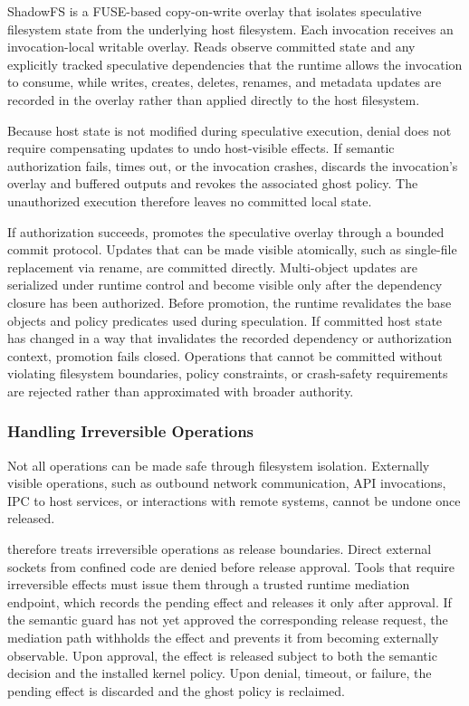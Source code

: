 ShadowFS is a FUSE-based copy-on-write overlay that isolates speculative
filesystem state from the underlying host filesystem. Each invocation receives
an invocation-local writable overlay. Reads observe committed state and any
explicitly tracked speculative dependencies that the runtime allows the
invocation to consume, while writes, creates, deletes, renames, and metadata
updates are recorded in the overlay rather than applied directly to the host
filesystem.

Because host state is not modified during speculative execution, denial does
not require compensating updates to undo host-visible effects. If semantic
authorization fails, times out, or the invocation crashes, \SystemName discards
the invocation's overlay and buffered outputs and revokes the associated ghost
policy. The unauthorized execution therefore leaves no committed local state.

If authorization succeeds, \SystemName promotes the speculative overlay through
a bounded commit protocol. Updates that can be made visible atomically, such as
single-file replacement via rename, are committed directly. Multi-object
updates are serialized under runtime control and become visible only after the
dependency closure has been authorized. Before promotion, the runtime
revalidates the base objects and policy predicates used during speculation. If
committed host state has changed in a way that invalidates the recorded
dependency or authorization context, promotion fails closed. Operations that
cannot be committed without violating filesystem boundaries, policy
constraints, or crash-safety requirements are rejected rather than approximated
with broader authority.

\subsubsection{Handling Irreversible Operations}
\label{sec:design:speculative:irreversible}

Not all operations can be made safe through filesystem isolation. Externally
visible operations, such as outbound network communication, API invocations,
IPC to host services, or interactions with remote systems, cannot be undone
once released.

\SystemName therefore treats irreversible operations as release boundaries.
Direct external sockets from confined code are denied before release approval.
Tools that require irreversible effects must issue them through a trusted
runtime mediation endpoint, which records the pending effect and releases it
only after approval. If the semantic guard has not yet approved the
corresponding release request, the mediation path withholds the effect and
prevents it from becoming externally observable. Upon approval, the effect is
released subject to both the semantic decision and the installed kernel policy.
Upon denial, timeout, or failure, the pending effect is discarded and the ghost
policy is reclaimed.


